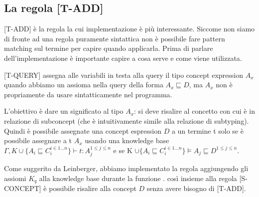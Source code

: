             \subsection{La regola [T-ADD]}
            [T-ADD] è la regola la cui implementazione è più interessante. Siccome non siamo di fronte ad una regola puramente sintattica
            non è possibile fare pattern matching sul termine per capire quando applicarla.
            Prima di parlare dell'implementazione è importante capire a cosa serve e come viene utilizzata. 
            
[T-QUERY] assegna alle variabili in testa alla query
            il tipo concept expression $A_x$ quando abbiamo un assioma nella query della forma $A_x \sqsubseteq D$, ma $A_x$ non è propriamente da usare sintatticamente nel programma.
            
            L'obiettivo è dare un significato al tipo $A_x$: si deve risalire al concetto con cui è in relazione di subconcept (che è intuitivamente simile alla relazione di subtyping). Quindi è possibile assegnate una concept espression $D$
            a un termine t solo se è possibile assegnare a t $A_x$ usando una knowledge base $\Gamma,K \cup \{A_i \sqsubseteq C_i^{i \in 1...n}\} \vdash t : A_j^{1 \leq j \leq n}$
            e se K $\cup \{A_i \sqsubseteq C_i^{i \in 1...n}\} \vDash A_j \sqsubseteq D^{1 \leq j \leq n}$.

Come suggerito da Leinberger, abbiamo implementato la regola aggiungendo gli assiomi $K_q$ alla knowledge base durante la funzione .
            così insieme alla regola {[S-CONCEPT]} è possibile risalire alla concept $D$ senza avere bisogno di [T-ADD].
